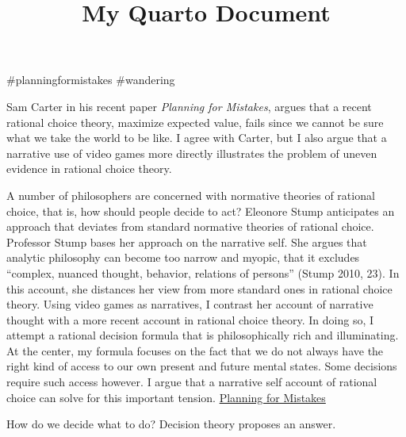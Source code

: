 \documentclass[
  letterpaper,
  DIV=11,
  numbers=noendperiod]{scrartcl}
\title{My Quarto Document}
\author{}
\date{}
\begin{document}
\maketitle


\#planningformistakes \#wandering

Sam Carter in his recent paper \emph{Planning for Mistakes}, argues that
a recent rational choice theory, maximize expected value, fails since we
cannot be sure what we take the world to be like. I agree with Carter,
but I also argue that a narrative use of video games more directly
illustrates the problem of uneven evidence in rational choice theory.

A number of philosophers are concerned with normative theories of
rational choice, that is, how should people decide to act? Eleonore
Stump anticipates an approach that deviates from standard normative
theories of rational choice. Professor Stump bases her approach on the
narrative self. She argues that analytic philosophy can become too
narrow and myopic, that it excludes ``complex, nuanced thought,
behavior, relations of persons'' (Stump 2010, 23). In this account, she
distances her view from more standard ones in rational choice theory.
Using video games as narratives, I contrast her account of narrative
thought with a more recent account in rational choice theory. In doing
so, I attempt a rational decision formula that is philosophically rich
and illuminating. At the center, my formula focuses on the fact that we
do not always have the right kind of access to our own present and
future mental states. Some decisions require such access however. I
argue that a narrative self account of rational choice can solve for
this important tension.
\href{https://app.notion.com/p/Planning-for-Mistakes-36e8935bcf8a8180a08ae53a494f1e59?pvs=21}{Planning
for Mistakes}

How do we decide what to do? Decision theory proposes an answer.
\end{document}
